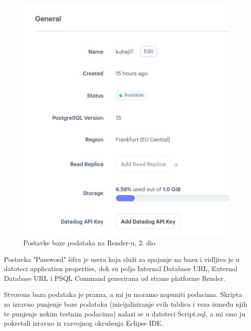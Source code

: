 		\begin{figure}[H]
			\includegraphics[scale=0.4]{slike/Render_DATABASE_2.JPG} %
			\centering
			\caption{Postavke baze podataka na Render-u, 2. dio}
			\label{Postavke baze podataka na Render-u, 2. dio}
		\end{figure}
		
		Postavka "Password" šifra je usera koja služi za spajanje na bazu i vidljiva je u datoteci application.properties, dok su polja Internal Database URL, External Database URL i PSQL Command generirana od strane platforme Render.
		
		Stvorena baza podataka je prazna, a mi ju moramo napuniti podacima. Skripta za izravno punjenje baze podataka (inicijaliziranje svih tablica i veza između njih te punjenje nekim testnim podacima) nalazi se u datoteci Script.sql, a mi smo ju pokretali izravno iz razvojnog okruženja Eclipse IDE.
		
				
	
		
	
	
	
		
		
		
		
		
		
		
		
		 
		
		
	    
	    
		
		
		
		
		
		
		
			
			\eject 
